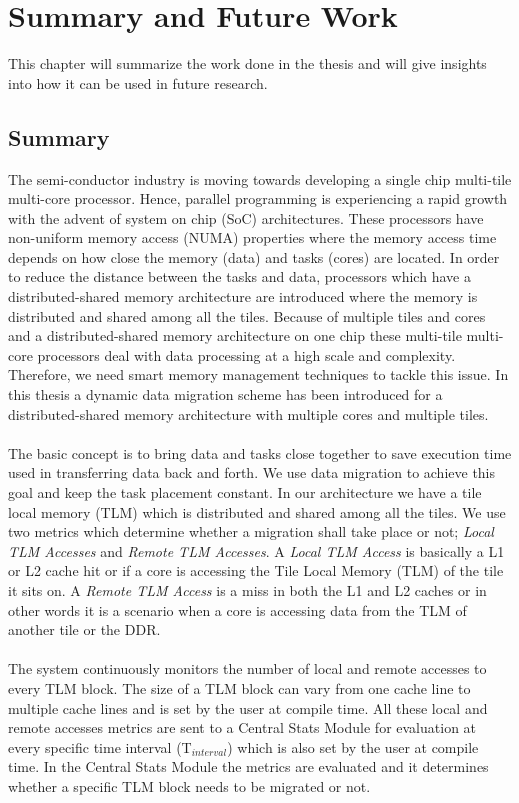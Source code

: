 \documentclass{listhesis}
\begin{document}
\chapter{Summary and Future Work}
This chapter will summarize the work done in the thesis and will give insights into how it can be used in future research. 

\section{Summary}
The semi-conductor industry is moving towards developing a single chip multi-tile multi-core processor. Hence, parallel programming is experiencing a rapid growth with the advent of system on chip (SoC) architectures. These processors have non-uniform memory access (NUMA) properties where the memory access time depends on how close the memory (data) and tasks (cores) are located. In order to reduce the distance between the tasks and data, processors which have a distributed-shared memory architecture are introduced where the memory is distributed and shared among all the tiles. Because of multiple tiles and cores and a distributed-shared memory architecture on one chip these multi-tile multi-core processors deal with data processing at a high scale and complexity. Therefore, we need smart memory management techniques to tackle this issue. In this thesis a dynamic data migration scheme has been introduced for a distributed-shared memory architecture with multiple cores and multiple tiles.\\
\\
The basic concept is to bring data and tasks close together to save execution time used in transferring data back and forth. We use data migration to achieve this goal and keep the task placement constant. In our architecture we have a tile local memory (TLM) which is distributed and shared among all the tiles. We use two metrics which determine whether a migration shall take place or not; \textit{Local TLM Accesses} and \textit{Remote TLM Accesses}. A \textit{Local TLM Access} is basically a L1 or L2 cache hit or if a core is accessing the Tile Local Memory (TLM) of the tile it sits on. A \textit{Remote TLM Access} is a miss in both the L1 and L2 caches or in other words it is a scenario when a core is accessing data from the TLM of another tile or the DDR. \\
\\
The system continuously monitors the number of local and remote accesses to every TLM block. The size of a TLM block can vary from one cache line to multiple cache lines and is set by the user at compile time. All these local and remote accesses metrics are sent to a Central Stats Module for evaluation at every specific time interval (T$_{interval}$) which is also set by the user at compile time. In the Central Stats Module the metrics are evaluated and it determines whether a specific TLM block needs to be migrated or not.\\
\end{document}
